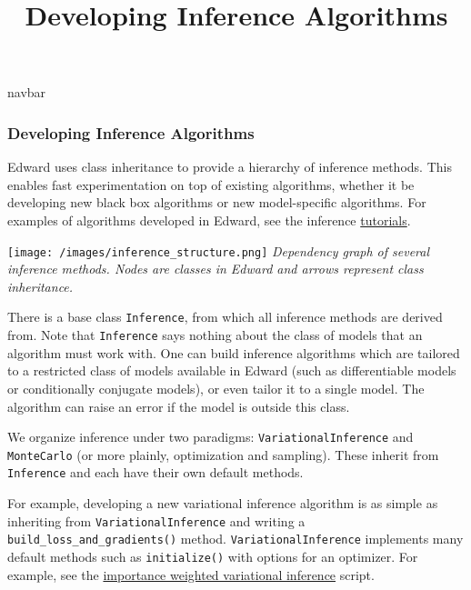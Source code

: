 \title{Developing Inference Algorithms}

{{navbar}}

\subsubsection{Developing Inference Algorithms}

Edward uses class inheritance to provide a hierarchy of inference
methods. This enables fast experimentation on top of existing
algorithms, whether it be developing new black box algorithms or
new model-specific algorithms.
For examples of algorithms developed in Edward, see the inference
\href{/tutorials/}{tutorials}.

\texttt{[image: /images/inference\_structure.png]}
{\small\textit{Dependency graph of several inference methods.
Nodes are classes in Edward and arrows represent class inheritance.}}

There is a base class \texttt{Inference}, from which all inference
methods are derived from. Note that \texttt{Inference} says nothing
about the class of models that an algorithm must work with. One can
build inference algorithms which are tailored to a restricted class of
models available in Edward (such as differentiable models or
conditionally conjugate models), or even tailor it to a single model.
The algorithm can raise an error if the model is outside this class.

We organize inference under two paradigms:
\texttt{VariationalInference} and \texttt{MonteCarlo} (or more plainly,
optimization and sampling). These inherit from \texttt{Inference} and each
have their own default methods.

For example, developing a new variational inference algorithm is as simple as
inheriting from \texttt{VariationalInference} and writing a
\texttt{build\_loss\_and\_gradients()} method. \texttt{VariationalInference} implements many default methods such
as \texttt{initialize()} with options for an optimizer.
For example, see the
\href{https://github.com/blei-lab/edward/blob/master/examples/iwvi.py}{importance
weighted variational inference} script.
